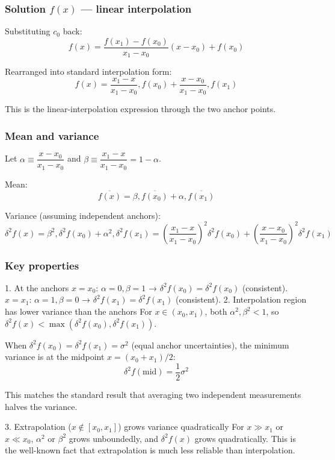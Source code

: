 \documentclass[twoside]{article}
\numberwithin{equation}{section}
\begin{document}
\subsubsection{Solution $f(x)$ — linear interpolation}
Substituting $c_0$ back:
$$f(x) = \frac{f(x_1) - f(x_0)}{x_1 - x_0}(x - x_0) + f(x_0)$$

Rearranged into standard interpolation form:
$$\boxed{f(x) = \frac{x_1 - x}{x_1 - x_0}, f(x_0) + \frac{x - x_0}{x_1 - x_0}, f(x_1)}$$

This is the linear-interpolation expression through the two anchor points.

\subsubsection{Mean and variance}
Let $\alpha \equiv \dfrac{x - x_0}{x_1 - x_0}$ and $\beta \equiv \dfrac{x_1 - x}{x_1 - x_0} = 1 - \alpha$.

Mean:
$$\overline{f(x)} = \beta, \overline{f(x_0)} + \alpha, \overline{f(x_1)}$$

Variance (assuming independent anchors):
$$\boxed{\delta^2 f(x) = \beta^2, \delta^2 f(x_0) + \alpha^2, \delta^2 f(x_1) = \left(\frac{x_1 - x}{x_1 - x_0}\right)^2 \delta^2 f(x_0) + \left(\frac{x - x_0}{x_1 - x_0}\right)^2 \delta^2 f(x_1)}$$

\subsubsection{Key properties}
1. At the anchors
$x = x_0$: $\alpha = 0, \beta = 1$ → $\delta^2 f(x_0) = \delta^2 f(x_0)$  (consistent).
$x = x_1$: $\alpha = 1, \beta = 0$ → $\delta^2 f(x_1) = \delta^2 f(x_1)$  (consistent).
2. Interpolation region has lower variance than the anchors
For $x \in (x_0, x_1)$, both $\alpha^2, \beta^2 < 1$, so $\delta^2 f(x) < \max(\delta^2 f(x_0), \delta^2 f(x_1))$.

When $\delta^2 f(x_0) = \delta^2 f(x_1) = \sigma^2$ (equal anchor uncertainties), the minimum variance is at the midpoint $x = (x_0 + x_1)/2$:
$$\delta^2 f(\text{mid}) = \frac{1}{2}\sigma^2$$

This matches the standard result that averaging two independent measurements halves the variance.

3. Extrapolation ($x \notin [x_0, x_1]$) grows variance quadratically
For $x \gg x_1$ or $x \ll x_0$, $\alpha^2$ or $\beta^2$ grows unboundedly, and $\delta^2 f(x)$ grows quadratically. This is the well-known fact that extrapolation is much less reliable than interpolation.
\end{document}
